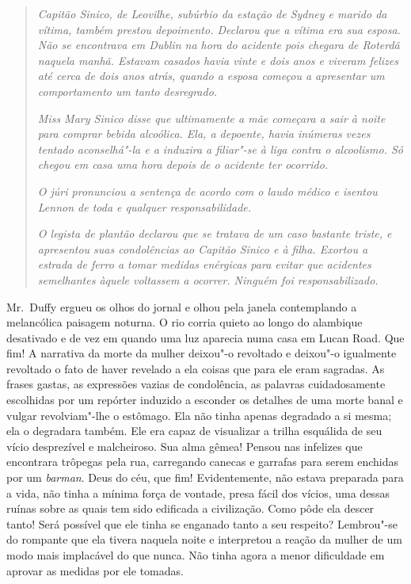 \begin{quote}
\textit{Capitão Sinico, de Leovilhe, subúrbio da estação de Sydney e
marido da vítima, também prestou depoimento.  Declarou que a vítima era sua
esposa.  Não se encontrava em Dublin na hora do acidente pois
chegara de Roterdã naquela manhã.  Estavam casados havia vinte
e dois anos e viveram felizes até cerca de dois anos atrás, quando a
esposa começou a apresentar um comportamento um tanto
desregrado.}

\textit{Miss Mary Sinico disse que ultimamente a mãe começara a sair à
noite para comprar bebida alcoólica.  Ela, a depoente, havia inúmeras
vezes tentado aconselhá"-la e a induzira a filiar"-se à liga
contra o alcoolismo.  Só chegou em casa uma hora depois de o acidente
ter ocorrido.}

\textit{O júri pronunciou a sentença de acordo com o laudo médico e
isentou Lennon de toda e qualquer responsabilidade.}

\textit{O legista de plantão declarou que se tratava de um caso
bastante triste, e apresentou suas condolências ao Capitão Sinico e à
filha.  Exortou a estrada de ferro a tomar medidas enérgicas
para evitar que acidentes semelhantes àquele voltassem a ocorrer.
Ninguém foi responsabilizado.}
\end{quote}

\smallskip

\noindent\dotfill

\smallskip

Mr.~Duffy ergueu os olhos do jornal e olhou pela janela contemplando a
melancólica paisagem noturna.  O rio corria quieto ao longo do alambique
desativado e de vez em quando uma luz aparecia numa casa em Lucan Road.  Que
fim!  A narrativa da morte da mulher deixou"-o revoltado e deixou"-o igualmente
revoltado o fato de haver revelado a ela coisas que para ele eram sagradas.  As
frases gastas, as expressões vazias de condolência, as palavras cuidadosamente
escolhidas por um repórter induzido a esconder os detalhes de uma morte banal e
vulgar revolviam"-lhe o estômago.  Ela não tinha apenas degradado a si mesma;
ela o degradara também.  Ele era capaz de visualizar a trilha esquálida de seu
vício desprezível e malcheiroso.  Sua alma gêmea!  Pensou nas infelizes que
encontrara trôpegas pela rua, carregando canecas e garrafas para serem enchidas
por um \textit{barman}.  Deus do céu, que fim!  Evidentemente, não estava
preparada para a vida, não tinha a mínima força de vontade, presa fácil dos
vícios, uma dessas ruínas sobre as quais tem sido edificada a civilização.
Como pôde ela descer tanto!  Será possível que ele tinha se enganado tanto a
seu respeito?  Lembrou"-se do rompante que ela tivera naquela noite e
interpretou a reação da mulher de um modo mais implacável do que nunca.  Não
tinha agora a menor dificuldade em aprovar as medidas por ele tomadas.

